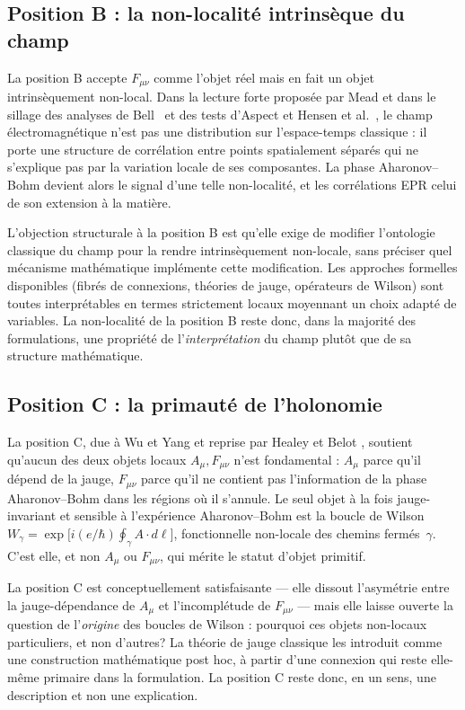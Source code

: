 \subsection{Position B : la non-localité intrinsèque du champ}
\label{ssec:position_B}

La position B accepte $F_{\mu\nu}$ comme l'objet réel mais en
fait un objet intrinsèquement non-local. Dans la lecture forte
proposée par Mead \cite{Mead2000} et dans le sillage des analyses
de Bell~\cite{Bell1964} et des tests d'Aspect \cite{Aspect1982} et
Hensen et al.~\cite{Hensen2015}, le champ
électromagnétique n'est pas une distribution sur l'espace-temps
classique : il porte une structure de corrélation entre points
spatialement séparés qui ne s'explique pas par la variation
locale de ses composantes. La phase Aharonov--Bohm devient alors
le signal d'une telle non-localité, et les corrélations EPR celui
de son extension à la matière.

L'objection structurale à la position B est qu'elle exige de
modifier l'ontologie classique du champ pour la rendre
intrinsèquement non-locale, sans préciser quel mécanisme
mathématique implémente cette modification. Les approches
formelles disponibles (fibrés de connexions, théories de jauge,
opérateurs de Wilson) sont toutes interprétables en termes
strictement locaux moyennant un choix adapté de variables. La
non-localité de la position B reste donc, dans la majorité des
formulations, une propriété de l'\emph{interprétation} du champ
plutôt que de sa structure mathématique.

\subsection{Position C : la primauté de l'holonomie}
\label{ssec:position_C}

La position C, due à Wu et Yang \cite{WuYang1975} et reprise par
Healey \cite{Healey2007} et Belot \cite{Belot1998}, soutient
qu'aucun des deux objets locaux $A_\mu, F_{\mu\nu}$ n'est
fondamental : $A_\mu$ parce qu'il dépend de la jauge,
$F_{\mu\nu}$ parce qu'il ne contient pas l'information de la
phase Aharonov--Bohm dans les régions où il s'annule. Le seul
objet à la fois jauge-invariant et sensible à l'expérience
Aharonov--Bohm est la boucle de Wilson
$W_\gamma = \exp\bigl[i (e/\hbar) \oint_\gamma A \cdot d\ell\bigr]$,
fonctionnelle non-locale des chemins fermés~$\gamma$. C'est elle,
et non $A_\mu$ ou $F_{\mu\nu}$, qui mérite le statut d'objet
primitif.

La position C est conceptuellement satisfaisante --- elle
dissout l'asymétrie entre la jauge-dépendance de $A_\mu$ et
l'incomplétude de $F_{\mu\nu}$ --- mais elle laisse ouverte la
question de l'\emph{origine} des boucles de Wilson : pourquoi
ces objets non-locaux particuliers, et non d'autres? La théorie
de jauge classique les introduit comme une construction
mathématique post hoc, à partir d'une connexion qui reste
elle-même primaire dans la formulation. La position C reste donc,
en un sens, une description et non une explication.

